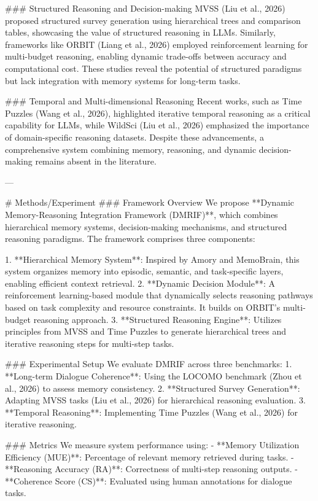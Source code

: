 ### Structured Reasoning and Decision-making  
MVSS (Liu et al., 2026) proposed structured survey generation using hierarchical trees and comparison tables, showcasing the value of structured reasoning in LLMs. Similarly, frameworks like ORBIT (Liang et al., 2026) employed reinforcement learning for multi-budget reasoning, enabling dynamic trade-offs between accuracy and computational cost. These studies reveal the potential of structured paradigms but lack integration with memory systems for long-term tasks.

### Temporal and Multi-dimensional Reasoning  
Recent works, such as Time Puzzles (Wang et al., 2026), highlighted iterative temporal reasoning as a critical capability for LLMs, while WildSci (Liu et al., 2026) emphasized the importance of domain-specific reasoning datasets. Despite these advancements, a comprehensive system combining memory, reasoning, and dynamic decision-making remains absent in the literature.

---

# Methods/Experiment  
### Framework Overview  
We propose **Dynamic Memory-Reasoning Integration Framework (DMRIF)**, which combines hierarchical memory systems, decision-making mechanisms, and structured reasoning paradigms. The framework comprises three components:

1. **Hierarchical Memory System**: Inspired by Amory and MemoBrain, this system organizes memory into episodic, semantic, and task-specific layers, enabling efficient context retrieval.
2. **Dynamic Decision Module**: A reinforcement learning-based module that dynamically selects reasoning pathways based on task complexity and resource constraints. It builds on ORBIT's multi-budget reasoning approach.
3. **Structured Reasoning Engine**: Utilizes principles from MVSS and Time Puzzles to generate hierarchical trees and iterative reasoning steps for multi-step tasks.

### Experimental Setup  
We evaluate DMRIF across three benchmarks:
1. **Long-term Dialogue Coherence**: Using the LOCOMO benchmark (Zhou et al., 2026) to assess memory consistency.
2. **Structured Survey Generation**: Adapting MVSS tasks (Liu et al., 2026) for hierarchical reasoning evaluation.
3. **Temporal Reasoning**: Implementing Time Puzzles (Wang et al., 2026) for iterative reasoning.

### Metrics  
We measure system performance using:
- **Memory Utilization Efficiency (MUE)**: Percentage of relevant memory retrieved during tasks.
- **Reasoning Accuracy (RA)**: Correctness of multi-step reasoning outputs.
- **Coherence Score (CS)**: Evaluated using human annotations for dialogue tasks.

